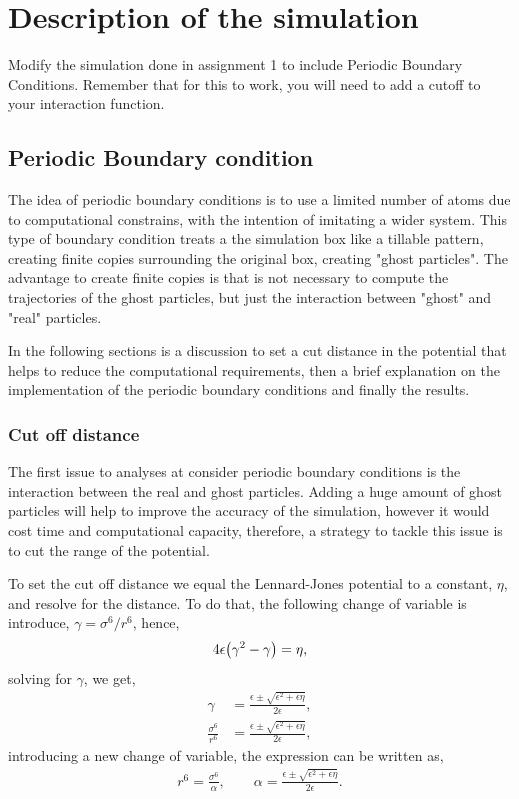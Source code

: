 \documentclass[main.tex]{subfiles}
\begin{document}
\section{Description of the simulation}

Modify the simulation done in assignment 1 to include Periodic Boundary Conditions. Remember that for this to work, you will need to add a cutoff to your interaction function. 

\subsection{Periodic Boundary condition}

The idea of periodic boundary conditions is to use a limited number of atoms due to computational constrains, with the intention of imitating a wider system.
This type of boundary condition treats a the simulation box like a tillable pattern, creating finite copies surrounding the original box, creating "ghost particles".
The advantage to create finite copies is that is not necessary to compute the trajectories of the ghost particles, but just the interaction between "ghost" and "real" particles.

In the following sections is a discussion to set a cut distance in the potential that helps to reduce the computational requirements, then a brief explanation on the implementation of the periodic boundary conditions and finally the results.


\subsubsection{Cut off distance}

The first issue to analyses at consider periodic boundary conditions is the interaction between the real and ghost particles.
Adding a huge amount of ghost particles will help to improve the accuracy of the simulation, however it would cost time and computational capacity, therefore, a strategy to tackle this issue is to cut the range of the potential.

To set the cut off distance we equal the Lennard-Jones potential to a constant, $\eta$, and resolve for the distance.
To do that, the following change of variable is introduce, $\gamma = \sigma^{6}/r^{6}$, hence,
\begin{gather*}
    4\epsilon\qty(\gamma^{2} - \gamma) = \eta,
\end{gather*}
solving for $\gamma$, we get,
\begin{align*}
    \gamma &= \frac{\epsilon\pm\sqrt{\epsilon^{2}+\epsilon\eta}}{2\epsilon}, \\
    \frac{\sigma^{6}}{r^{6}} &= \frac{\epsilon\pm\sqrt{\epsilon^{2}+\epsilon\eta}}{2\epsilon},
\end{align*}
introducing a new change of variable, the expression can be written as,
\begin{gather*}
    r^{6} = \frac{\sigma^{6}}{\alpha},\qquad\alpha = \frac{\epsilon\pm\sqrt{\epsilon^{2}+\epsilon\eta}}{2\epsilon}.
\end{gather*}
\end{document}

